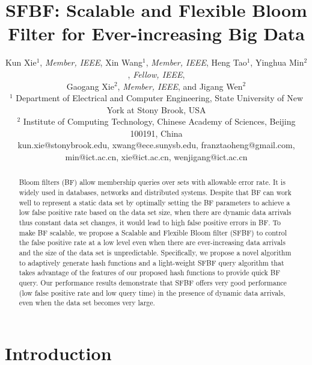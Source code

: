 \documentclass[10pt,journal,letterpaper]{IEEEtran}
\begin{document}
\title{SFBF: Scalable and Flexible Bloom Filter for Ever-increasing Big Data}
\author{Kun Xie$^1$, \emph{Member, IEEE},  Xin Wang$^1$, \emph{Member, IEEE}, Heng Tao$^1$, Yinghua Min$^2$, \emph{Fellow, IEEE}, \\ Gaogang Xie$^2$, \emph{Member, IEEE}, and Jigang Wen$^2$ \\
$^1$ Department of Electrical and Computer Engineering, State University of New York at Stony Brook, USA\\
$^2$ Institute of Computing Technology, Chinese Academy of Sciences, Beijing 100191, China\\
kun.xie@stonybrook.edu, xwang@ece.sunysb.edu, franztaoheng@gmail.com,  min@ict.ac.cn, xie@ict.ac.cn, wenjigang@ict.ac.cn }
\maketitle
\vspace{-3em}
\begin{abstract}
Bloom filters (BF) allow membership queries over sets with allowable error rate. It is widely used in databases, networks and distributed systems. Despite that BF can work well to represent a static data set by optimally setting the BF parameters to achieve a low false positive rate based on the data set size, when there are dynamic data arrivals thus constant data set changes, it would lead to high false positive errors in BF. To make BF scalable, we propose a Scalable and Flexible Bloom filter (SFBF) to control the false positive rate at a low level even when there are ever-increasing data arrivals and the size of the data set is unpredictable. Specifically, we propose a novel algorithm to adaptively generate hash functions and a light-weight SFBF query algorithm that takes advantage of the features of our proposed hash functions to provide quick BF query. Our performance results demonstrate that SFBF offers very good performance (low false positive rate and low query time) in the presence of dynamic data arrivals, even when the data set becomes very large.
\end{abstract}


\section{Introduction}
\end{document}

